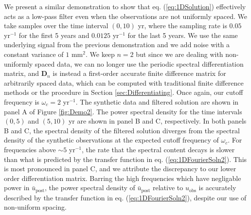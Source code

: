 \documentclass[10pt,a4paper]{article}
\begin{document}
We present a similar demonstration to show that eq. (\ref{eq:1DSolution}) effectively acts as a low-pass filter even when the observations are not uniformly spaced.  We take samples over the time interval $(0,10)$ yr, where the sampling rate is $0.05$ yr$^{-1}$ for the first 5 years and $0.0125$ yr$^{-1}$ for the last 5 years.  We use the same underlying signal from the previous demonstration and we add noise with a constant variance of $1$ mm$^2$.  We keep $n=2$ but since we are dealing with non-uniformly spaced data, we can no longer use the periodic spectral differentiation matrix, and $\mathbf{D}_n$ is instead a first-order accurate finite difference matrix for arbitrarily spaced data, which can be computed with traditional finite difference methods \citet{Fornberg1996} or the procedure in Section \ref{sec:Differentiating}.  Once again, our cutoff frequency is $\omega_c = 2$ yr$^{-1}$.  The synthetic data and filtered solution are shown in panel A of Figure \ref{fig:Demo2}.  The power spectral density for the time intervals $(0,5)$ and $(5,10)$ yr are shown in panel B and C, respectively.  In both panels B and C, the spectral density of the filtered solution diverges from the spectral density of the synthetic observations at the expected cutoff frequency of $\omega_c$.  For frequencies above ${\sim}5$ yr$^{-1}$, the rate that the spectral content decays is slower than what is predicted by the transfer function in eq. (\ref{eq:1DFourierSoln2}). This is most pronounced in panel C, and we attribute the discrepancy to our lower order differentiation matrix. Barring the high frequencies which have negligable power in $\bar{u}_\mathrm{post}$, the power spectral density of $\bar{u}_\mathrm{post}$ relative to $u_\mathrm{obs}$ is accurately described by the transfer function in eq. (\ref{eq:1DFourierSoln2}), despite our use of non-uniform spacing.
\end{document}
